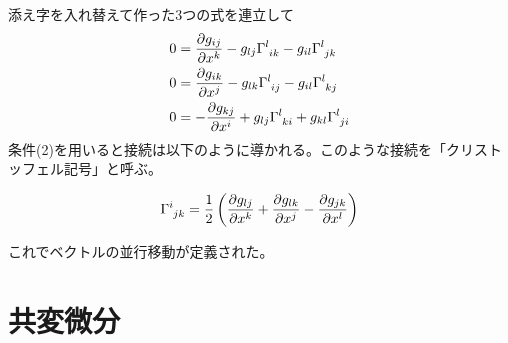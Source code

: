 \documentclass[dvipdfmx]{report} %
\begin{document}
添え字を入れ替えて作った3つの式を連立して
\begin{equation*}
\begin{split}
	0 &=	\frac{\partial g_{ij}}{\partial x^k}
		- g_{lj} \tensor{\Gamma}{^l_{ik}}
		- g_{il} \tensor{\Gamma}{^l_{jk}}\\
	0 &=	\frac{\partial g_{ik}}{\partial x^j}
		- g_{lk} \tensor{\Gamma}{^l_{ij}}
		- g_{il}  \tensor{\Gamma}{^l_{kj}}\\
	0 &=	- \frac{\partial g_{kj}}{\partial x^i}
		+ g_{lj} \tensor{\Gamma}{^l_{ki}}
		+ g_{kl} \tensor{\Gamma}{^l_{ji}}\\
\end{split}
\end{equation*}
条件(2)を用いると接続は以下のように導かれる。このような接続を「クリストッフェル記号」と呼ぶ。
\begin{tcolorbox}[title=クリストッフェル記号]
\begin{eqnarray*}
	\tensor{\Gamma}{^i_{jk}} = \frac{1}{2} \left( \frac{\partial g_{lj}}{\partial x^k} + \frac{\partial g_{lk}}{\partial x^j} - \frac{\partial g_{jk}}{\partial x^l} \right)
\end{eqnarray*}
\end{tcolorbox}
これでベクトルの並行移動が定義された。

\section{共変微分}


\end{document}
